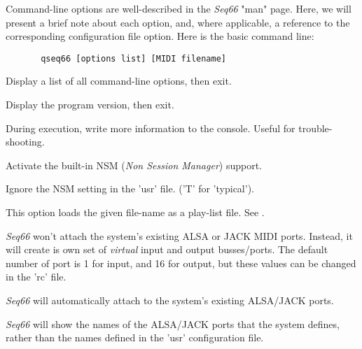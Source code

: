    Command-line options are well-described in the \textsl{Seq66} "man" page.
   Here, we will present a brief note about each option, and, where applicable, a
   reference to the corresponding configuration file option.
   Here is the basic command line:

   \begin{verbatim}
       qseq66 [options list] [MIDI filename]
   \end{verbatim}

      Display a list of all command-line options, then exit.

      Display the program version, then exit.

      During execution, write more information to the console.  Useful for
      trouble-shooting.
   

      Activate the built-in NSM (\textsl{Non Session Manager}) support.

      Ignore the NSM setting in the 'usr' file. ('T' for 'typical').

      This option loads the given file-name as a play-list file.
      See .



      \textsl{Seq66} won't attach the system's existing ALSA or JACK MIDI ports.
      Instead, it will create is own set of \textsl{virtual}
      input and output busses/ports.  The default number of port is 1 for input,
      and 16 for output, but these values can be changed in the 'rc' file.


      \textsl{Seq66} will automatically attach to the system's existing
      ALSA/JACK ports.


      \textsl{Seq66} will show the names of the ALSA/JACK ports that the system
      defines, rather than the names defined in the 'usr' configuration file.

